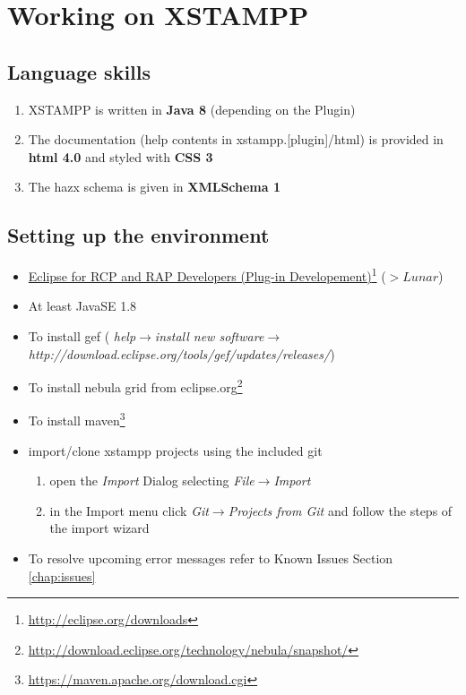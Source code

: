 \section{Working on XSTAMPP}

\subsection{Language skills}
\begin{enumerate}
\item XSTAMPP is written in \textbf{Java 8} (depending on the Plugin)
\item The documentation (help contents in xstampp.[plugin]/html) is provided in \textbf{html 4.0} and styled with \textbf{CSS 3}
\item The hazx schema is given in \textbf{XMLSchema 1}
\end{enumerate}
\subsection{Setting up the environment}
\begin{itemize}
\item \href{http://eclipse.org/downloads}{Eclipse for RCP and RAP Developers (Plug-in Developement)}\footnote{\url{http://eclipse.org/downloads}} ($> Lunar$)
\item At least JavaSE 1.8
\item To install gef ( \textit{help}$\rightarrow$\textit{install new software}$\rightarrow$\textit{http://download.eclipse.org/tools/gef/updates/releases/})
\item To install nebula grid from eclipse.org\footnote{\url{http://download.eclipse.org/technology/nebula/snapshot/}}
\item To install maven\footnote{\url{https://maven.apache.org/download.cgi}}
\item import/clone xstampp projects using the included git
	\begin{enumerate}
	\item open the \textit{Import} Dialog selecting \textit{File}$\rightarrow$\textit{Import}
	\item in the Import menu click \textit{Git}$\rightarrow$\textit{Projects from Git} and follow the steps of the import wizard
	\end{enumerate}
\item To resolve upcoming error messages refer to Known Issues Section \ref{chap:issues}
\end{itemize}

